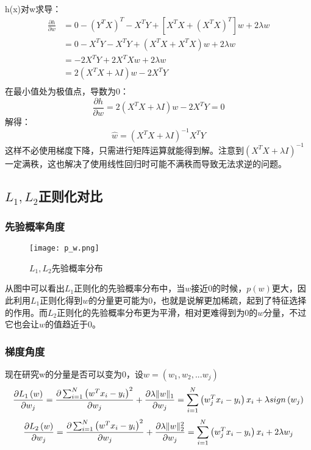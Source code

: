 \documentclass[forprint]{report}
\begin{document}
h(x)对w求导：
$$
\begin{aligned}
\frac{\partial h}{\partial w}
&=0-\left( Y^TX \right) ^T-X^TY+\left[ X^TX+\left( X^TX \right) ^T \right] w+2\lambda w\\
&=0-X^TY-X^TY+\left( X^TX+X^TX \right) w+2\lambda w\\
&=-2X^TY+2X^TXw+2\lambda w\\
&=2\left( X^TX+\lambda I \right) w-2X^TY\\
\end{aligned}
$$
在最小值处为极值点，导数为0：
$$
\frac{\partial h}{\partial w}=2\left( X^TX+\lambda I \right) w-2X^TY=0       
$$
解得：
$$
 \hat{w}=\left( X^TX+\lambda I \right) ^{-1}X^TY
$$
这样不必使用梯度下降，只需进行矩阵运算就能得到解。注意到$\left( X^TX+\lambda I \right) ^{-1}$一定满秩，这也解决了使用线性回归时可能不满秩而导致无法求逆的问题。
\subsection{$L_1,L_2$正则化对比}
\subsubsection{先验概率角度}
\begin{figure}[ht]
	\centering
	\texttt{[image: p\_w.png]}
	\caption{$L_1,L_2$先验概率分布}
	\label{fig:1}
\end{figure}

从图中可以看出$L_1$正则化的先验概率分布中，当$w$接近0的时候，$p\left( w \right)$更大，因此利用$L_1$正则化得到$w$的分量更可能为0，也就是说解更加稀疏，起到了特征选择的作用。而$L_2$正则化的先验概率分布更为平滑，相对更难得到为0的$w$分量，不过它也会让$w$的值趋近于0。
\subsubsection{梯度角度}

现在研究w的分量是否可以变为0，设$w=\left( w_1,w_2,...w_j \right) $
$$
\frac{\partial L_1\left( w \right)}{\partial w_j}=\frac{\partial \sum_{i=1}^N{\left( w^Tx_i-y_i \right) ^2}}{\partial w_j}+\frac{\partial \lambda \lVert w \rVert _1}{\partial w_j}
\\
=\sum_{i=1}^N{\left( w_{j}^{T}x_i-y_i \right) x_i+\lambda sign\left( w_j \right)}
$$
$$
\frac{\partial L_2\left( w \right)}{\partial w_j}=\frac{\partial \sum_{i=1}^N{\left( w^Tx_i-y_i \right) ^2}}{\partial w_j}+\frac{\partial \lambda \lVert w \rVert _{2}^{2}}{\partial w_j}
\\
=\sum_{i=1}^N{\left( w_{j}^{T}x_i-y_i \right) x_i+2\lambda w_j}
$$
\end{document}
